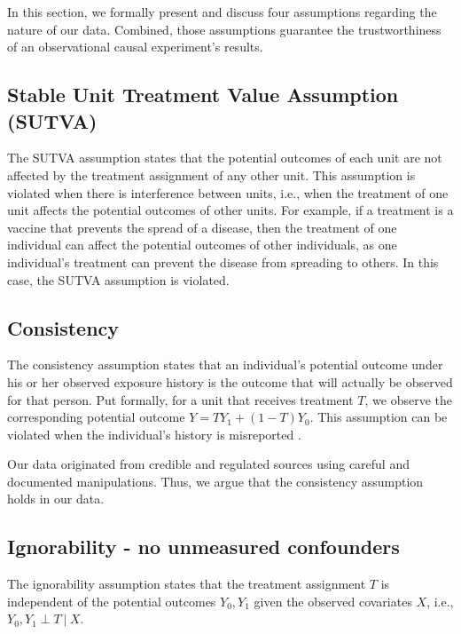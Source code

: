 \documentclass[11pt]{article}
\newcommand{\todo}[1]{{\color{orange}{TODO: #1}}}
\newcommand{\gur}[1]{{\color{teal}{Gur: #1}}}
\begin{document}
In this section, we formally present and discuss four assumptions regarding the nature of our data. Combined, those assumptions guarantee the trustworthiness of an observational causal experiment's results.

\subsection{Stable Unit Treatment Value Assumption (SUTVA)}

The SUTVA assumption states that the potential outcomes of each unit are not affected by the treatment assignment of any other unit. This assumption is violated when there is interference between units, i.e., when the treatment of one unit affects the potential outcomes of other units. For example, if a treatment is a vaccine that prevents the spread of a disease, then the treatment of one individual can affect the potential outcomes of other individuals, as one individual's treatment can prevent the disease from spreading to others. In this case, the SUTVA assumption is violated.

\todo{In our data...}

\subsection{Consistency}

The consistency assumption states that an individual's potential outcome under his or her observed exposure history is the outcome that will actually be observed for that person. Put formally, for a unit that receives treatment $T$, we observe the corresponding potential outcome $Y = TY_1 + (1-T)Y_0$. This assumption can be violated when the individual's history is misreported \gur{(e.g., "Have you ever tried LSD?)}.

Our data originated from credible and regulated sources using careful and documented manipulations. Thus, we argue that the consistency assumption holds in our data.

\subsection{Ignorability - no unmeasured confounders}

The ignorability assumption states that the treatment assignment $T$ is independent of the potential outcomes $Y_0, Y_1$ given the observed covariates $X$, i.e., $Y_0, Y_1 \perp T \ | \ X$. 

\gur{'Unverifiable assumption.' https://www.ncbi.nlm.nih.gov/pmc/articles/PMC10666970/}
\end{document}
